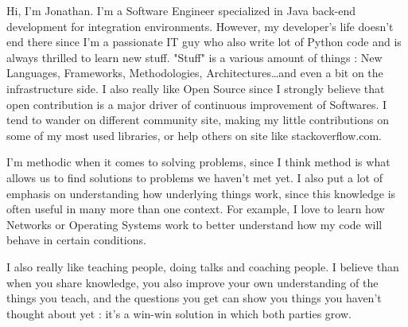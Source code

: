 

\begin{cvparagraph}

Hi, I'm Jonathan. I'm a Software Engineer specialized in Java back-end development for integration environments. 
However, my developer's life doesn't end there since I'm a passionate IT guy who also write lot of Python code and is always thrilled to learn new stuff.
"Stuff" is a various amount of things : New Languages, Frameworks, Methodologies, Architectures\dots and even a bit on the infrastructure side. 
I also really like Open Source since I strongly believe that open contribution is a major driver of continuous improvement of Softwares.
I tend to wander on different community site, making my little contributions on some of my most used libraries, or help others on site like stackoverflow.com.

I'm methodic when it comes to solving problems, since I think method is what allows us to find solutions to problems we haven't met yet. 
I also put a lot of emphasis on understanding how underlying things work, since this knowledge is often useful in many more than one context. 
For example, I love to learn how Networks or Operating Systems work to better understand how my code will behave in certain conditions.

I also really like teaching people, doing talks and coaching people. I believe than when you share knowledge, you also improve your own understanding 
of the things you teach, and the questions you get can show you things you haven't thought about yet : it's a win-win solution in which both parties grow.

\end{cvparagraph}
